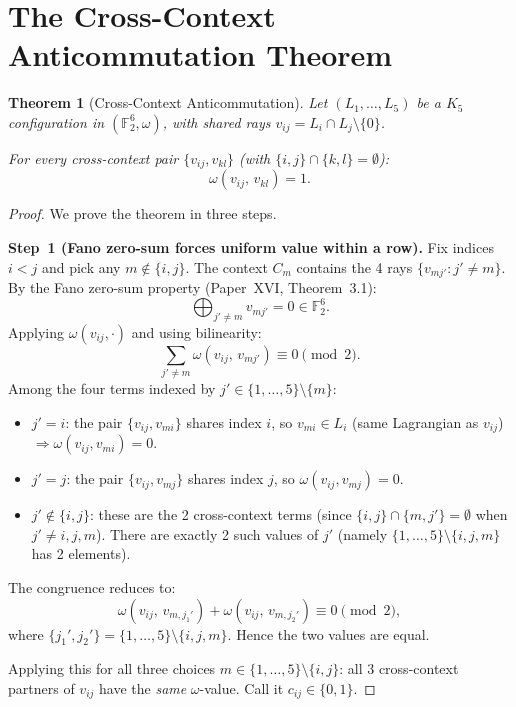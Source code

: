 \documentclass[11pt,a4paper]{article}
\newtheorem{theorem}{Theorem}[section]
\theoremstyle{remark}
\begin{document}
\section{The Cross-Context Anticommutation Theorem}\label{sec:main}

\begin{theorem}[Cross-Context Anticommutation]\label{thm:main}
Let $(L_1, \ldots, L_5)$ be a $K_5$ configuration in
$(\mathbb{F}_2^6, \omega)$, with shared rays $v_{ij} = L_i \cap L_j \setminus \{0\}$.

For every cross-context pair $\{v_{ij}, v_{kl}\}$
(with $\{i,j\} \cap \{k,l\} = \emptyset$):
\[
  \omega(v_{ij},\, v_{kl}) = 1.
\]
\end{theorem}

\begin{proof}
We prove the theorem in three steps.

\textbf{Step~1 (Fano zero-sum forces uniform value within a row).}
Fix indices $i < j$ and pick any $m \notin \{i,j\}$.
The context $C_m$ contains the 4 rays $\{v_{mj'} : j' \neq m\}$.
By the Fano zero-sum property (Paper~XVI, Theorem~3.1):
\[
  \bigoplus_{j' \neq m} v_{mj'} = 0 \in \mathbb{F}_2^6.
\]
Applying $\omega(v_{ij}, \cdot)$ and using bilinearity:
\[
  \sum_{j' \neq m} \omega(v_{ij},\, v_{mj'}) \equiv 0 \pmod 2.
\]
Among the four terms indexed by $j' \in \{1,\ldots,5\} \setminus \{m\}$:
\begin{itemize}
  \item $j' = i$: the pair $\{v_{ij}, v_{mi}\}$ shares index $i$,
        so $v_{mi} \in L_i$ (same Lagrangian as $v_{ij}$)
        $\Rightarrow \omega(v_{ij}, v_{mi}) = 0$.
  \item $j' = j$: the pair $\{v_{ij}, v_{mj}\}$ shares index $j$,
        so $\omega(v_{ij}, v_{mj}) = 0$.
  \item $j' \notin \{i,j\}$: these are the 2 cross-context terms
        (since $\{i,j\} \cap \{m,j'\} = \emptyset$ when $j' \neq i,j,m$).
        There are exactly 2 such values of $j'$
        (namely $\{1,\ldots,5\} \setminus \{i,j,m\}$ has 2 elements).
\end{itemize}

The congruence reduces to:
\[
  \omega(v_{ij},\, v_{m,j_1'}) + \omega(v_{ij},\, v_{m,j_2'}) \equiv 0 \pmod 2,
\]
where $\{j_1', j_2'\} = \{1,\ldots,5\} \setminus \{i,j,m\}$.
Hence the two values are equal.

Applying this for all three choices $m \in \{1,\ldots,5\} \setminus \{i,j\}$:
all 3 cross-context partners of $v_{ij}$ have the \emph{same} $\omega$-value.
Call it $c_{ij} \in \{0, 1\}$.


\end{proof}
\end{document}
